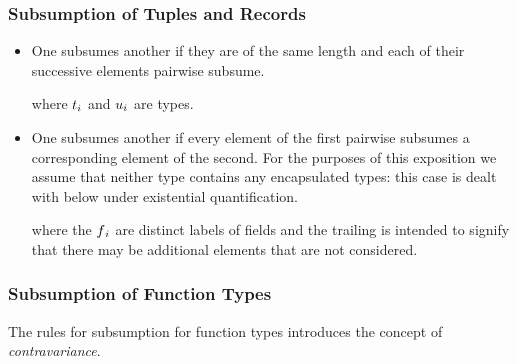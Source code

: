\subsubsection{Subsumption of Tuples and Records}
\begin{itemize}

\item One  subsumes another if they are of the same length and each of their successive elements pairwise subsume.
\begin{prooftree}
\end{prooftree}
where $t\subi$ and $u\subi$ are types.


\item One  subsumes another if every element of the first pairwise subsumes a corresponding element of the second. For the purposes of this exposition we assume that neither type contains any encapsulated types: this case is dealt with below under existential quantification.


\begin{prooftree}
\end{prooftree}
where the $f\subi$ are distinct labels of fields and the trailing  is intended to signify that there may be additional elements that are not considered.

\end{itemize}

\subsubsection{Subsumption of Function Types}

The rules for subsumption for function types introduces the concept of \emph{contravariance}.

